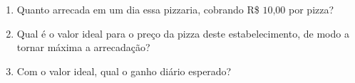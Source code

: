 \begin{enumerate}
\begin{enumerate}
\item {} 
Quanto arrecada em um dia essa pizzaria, cobrando R\$ \(10\text{,}00\) por pizza?

\item {} 
Qual é o valor ideal para o preço da pizza deste estabelecimento, de modo a tornar máxima a arrecadação?

\item {} 
Com o valor ideal, qual o ganho diário esperado?

\end{enumerate}
\end{enumerate}